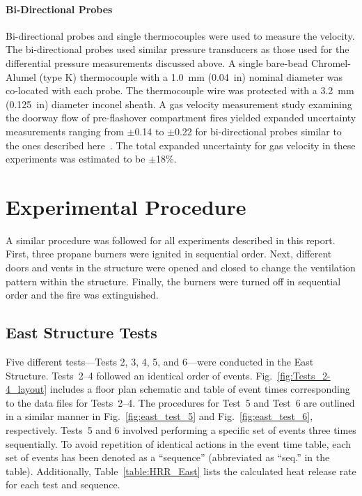 \documentclass[12pt,oneside]{book}
\begin{document}
\subsubsection{Bi-Directional Probes}
Bi-directional probes and single thermocouples were used to measure the velocity. The bi-directional probes used similar pressure transducers as those used for the differential pressure measurements discussed above. A single bare-bead Chromel-Alumel (type K) thermocouple with a 1.0~mm (0.04~in) nominal diameter was co-located with each probe. The thermocouple wire was protected with a 3.2~mm (0.125~in) diameter inconel sheath. A gas velocity measurement study examining the doorway flow of pre-flashover compartment fires yielded expanded uncertainty measurements ranging from $\pm$0.14 to $\pm$0.22 for bi-directional probes similar to the ones described here~\cite{Bryant:FSJ2009}. The total expanded uncertainty for gas velocity in these experiments was estimated to be $\pm$18\%.

\clearpage

\chapter{Experimental Procedure}
\label{chap:Experimental_Procedure}
A similar procedure was followed for all experiments described in this report. First, three propane burners were ignited in sequential order. Next, different doors and vents in the structure were opened and closed to change the ventilation pattern within the structure. Finally, the burners were turned off in sequential order and the fire was extinguished.

\section{East Structure Tests}
\label{sec:east_procedure}
Five different tests---Tests 2, 3, 4, 5, and 6---were conducted in the East Structure. Tests~2--4 followed an identical order of events. Fig.~\ref{fig:Tests_2-4_layout} includes a floor plan schematic and table of event times corresponding to the data files for Tests~2--4. The procedures for Test~5 and Test~6 are outlined in a similar manner in Fig.~\ref{fig:east_test_5} and Fig.~\ref{fig:east_test_6}, respectively. Tests~5 and 6 involved performing a specific set of events three times sequentially. To avoid repetition of identical actions in the event time table, each set of events has been denoted as a ``sequence'' (abbreviated as ``seq.'' in the table). Additionally, Table~\ref{table:HRR_East} lists the calculated heat release rate for each test and sequence.
\end{document}
